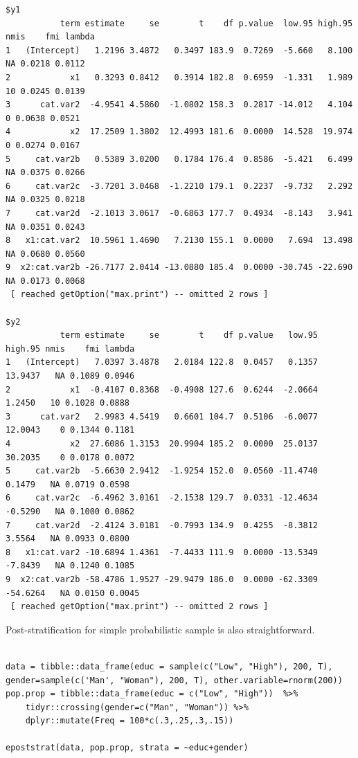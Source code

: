 \documentclass[a4paper]{article}
\begin{document}
\begin{verbatim}
$y1
           term estimate     se        t    df p.value  low.95 high.95 nmis    fmi lambda
1   (Intercept)   1.2196 3.4872   0.3497 183.9  0.7269  -5.660   8.100   NA 0.0218 0.0112
2            x1   0.3293 0.8412   0.3914 182.8  0.6959  -1.331   1.989   10 0.0245 0.0139
3      cat.var2  -4.9541 4.5860  -1.0802 158.3  0.2817 -14.012   4.104    0 0.0638 0.0521
4            x2  17.2509 1.3802  12.4993 181.6  0.0000  14.528  19.974    0 0.0274 0.0167
5     cat.var2b   0.5389 3.0200   0.1784 176.4  0.8586  -5.421   6.499   NA 0.0375 0.0266
6     cat.var2c  -3.7201 3.0468  -1.2210 179.1  0.2237  -9.732   2.292   NA 0.0325 0.0218
7     cat.var2d  -2.1013 3.0617  -0.6863 177.7  0.4934  -8.143   3.941   NA 0.0351 0.0243
8   x1:cat.var2  10.5961 1.4690   7.2130 155.1  0.0000   7.694  13.498   NA 0.0680 0.0560
9  x2:cat.var2b -26.7177 2.0414 -13.0880 185.4  0.0000 -30.745 -22.690   NA 0.0173 0.0068
 [ reached getOption("max.print") -- omitted 2 rows ]

$y2
           term estimate     se        t    df p.value   low.95  high.95 nmis    fmi lambda
1   (Intercept)   7.0397 3.4878   2.0184 122.8  0.0457   0.1357  13.9437   NA 0.1089 0.0946
2            x1  -0.4107 0.8368  -0.4908 127.6  0.6244  -2.0664   1.2450   10 0.1028 0.0888
3      cat.var2   2.9983 4.5419   0.6601 104.7  0.5106  -6.0077  12.0043    0 0.1344 0.1181
4            x2  27.6086 1.3153  20.9904 185.2  0.0000  25.0137  30.2035    0 0.0178 0.0072
5     cat.var2b  -5.6630 2.9412  -1.9254 152.0  0.0560 -11.4740   0.1479   NA 0.0719 0.0598
6     cat.var2c  -6.4962 3.0161  -2.1538 129.7  0.0331 -12.4634  -0.5290   NA 0.1000 0.0862
7     cat.var2d  -2.4124 3.0181  -0.7993 134.9  0.4255  -8.3812   3.5564   NA 0.0933 0.0800
8   x1:cat.var2 -10.6894 1.4361  -7.4433 111.9  0.0000 -13.5349  -7.8439   NA 0.1240 0.1085
9  x2:cat.var2b -58.4786 1.9527 -29.9479 186.0  0.0000 -62.3309 -54.6264   NA 0.0150 0.0045
 [ reached getOption("max.print") -- omitted 2 rows ]
\end{verbatim}

Post-stratification for simple probabilistic sample is also straightforward.

\lstset{numbers=left,language=r,label= ,caption= ,captionpos=b}
\begin{lstlisting}

data = tibble::data_frame(educ = sample(c("Low", "High"), 200, T), gender=sample(c('Man', "Woman"), 200, T), other.variable=rnorm(200)) 
pop.prop = tibble::data_frame(educ = c("Low", "High"))  %>%
    tidyr::crossing(gender=c("Man", "Woman")) %>%
    dplyr::mutate(Freq = 100*c(.3,.25,.3,.15)) 

epoststrat(data, pop.prop, strata = ~educ+gender) 
\end{lstlisting}
\end{document}
